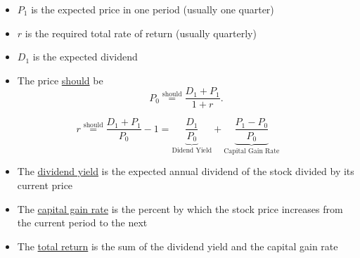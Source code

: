 \documentclass{beamer}
\newcommand{\should}{\overset{\text{should}}{=}}
\begin{document}
\begin{frame}{}
	\begin{figure}[H]
		\begin{center}
		\end{center}
	\end{figure}
	\begin{itemize}
		\item $P_{1}$ is the expected price in one period (usually one quarter)
		\item $r$ is the required total rate of return (usually quarterly)
		\item $D_{1}$ is the expected dividend 
		\item The price \underline{should} be
		\begin{equation*}
			P_{0}\should\frac{D_{1}+P_{1}}{1+r}.
		\end{equation*}
	\end{itemize}
\end{frame}

\begin{frame}{}
\begin{equation*}
r\should\frac{D_{1}+P_{1}}{P_{0}}-1=\underbrace{\frac{D_{1}}{P_{0}}}_{\text{Didend Yield}}+\underbrace{\frac{P_{1}-P_{0}}{P_{0}}}_{\text{Capital Gain Rate}}
\end{equation*}
\begin{itemize}
\item The \underline{dividend yield} is the expected annual dividend of the stock divided by its current price 
\item The \underline{capital gain rate} is the percent by which the stock price increases from the current period to the next
\item The \underline{total return} is the sum of the dividend yield and the capital gain rate  
\end{itemize}
\end{frame}
\end{document}
